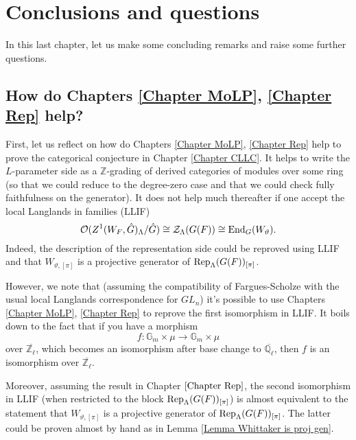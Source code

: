 \chapter{Conclusions and questions}\label{Chapter conclusion}


In this last chapter, let us make some concluding remarks and raise some further questions.

\section{How do Chapters \ref{Chapter MoLP}, \ref{Chapter Rep} help?}

First, let us reflect on how do Chapters \ref{Chapter MoLP}, \ref{Chapter Rep} help to prove the categorical conjecture in Chapter \ref{Chapter CLLC}. It helps to write the $L$-parameter side as a $\mathbb{Z}$-grading of derived categories of modules over some ring (so that we could reduce to the degree-zero case and that we could check fully faithfulness on the generator). It does not help much thereafter if one accept the local Langlands in families (LLIF)
$$\mathcal{O}(Z^1(W_F, \hat{G})_{\Lambda}/\hat{G}) \cong \mathcal{Z}_{\Lambda}(G(F)) \cong \operatorname{\operatorname{End}}_{G}(W_{\vartheta}).$$
Indeed, the description of the representation side could be reproved using LLIF and that $W_{\vartheta, [\pi]}$ is a projective generator of $\operatorname{\operatorname{Rep}}_{\Lambda}(G(F))_{[\pi]}$.

However, we note that (assuming the compatibility of Fargues-Scholze with the usual local Langlands correspondence for $GL_n$) it's possible to use Chapters \ref{Chapter MoLP}, \ref{Chapter Rep} to reprove the first isomorphism in LLIF. It boils down to the fact that if you have a morphism 
$$f: \mathbb{G}_m \times \mu \longrightarrow \mathbb{G}_m \times \mu$$
over $\overline{\mathbb{Z}_{\ell}}$, which becomes an isomorphism after base change to $\overline{\mathbb{Q}_{\ell}}$, then $f$ is an isomorphism over $\overline{\mathbb{Z}_{\ell}}$.

Moreover, assuming the result in Chapter $\ref{Chapter Rep}$, the second isomorphism in LLIF (when restricted to the block $\operatorname{\operatorname{Rep}}_{\Lambda}(G(F))_{[\pi]}$) is almost equivalent to the statement that $W_{\vartheta, [\pi]}$ is a projective generator of $\operatorname{\operatorname{Rep}}_{\Lambda}(G(F))_{[\pi]}$. The latter could be proven almost by hand as in Lemma \ref{Lemma Whittaker is proj gen}.

